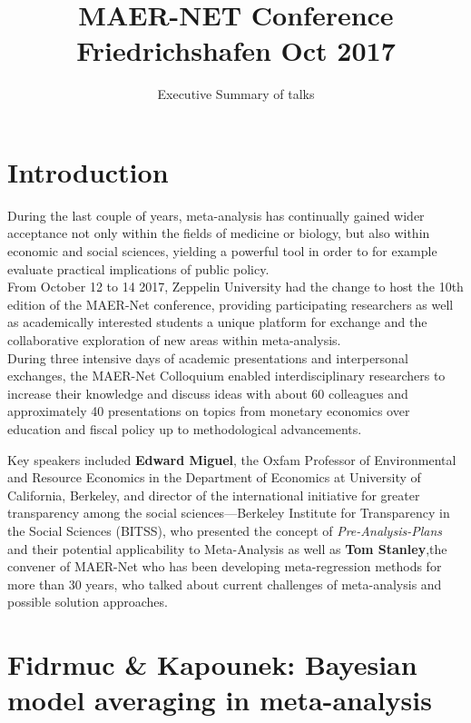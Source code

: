 \documentclass[a4paper,man,natbib]{apa6}
\title{MAER-NET Conference Friedrichshafen Oct 2017}
\affiliation{Marcel Schliebs}
\author{Executive Summary of talks}
\begin{document}
	
\justifying
\maketitle

\tableofcontents

\justifying

\section{Introduction}

During the last couple of years, meta-analysis has continually gained wider acceptance not only within the fields of medicine or biology, but also within economic and social sciences, yielding a powerful tool in order to for example evaluate practical implications of public policy. \\

From October 12 to 14 2017, Zeppelin University had the change to host the 10th edition of the MAER-Net conference, providing participating researchers as well as academically interested students a unique platform for exchange and the collaborative exploration of new areas within meta-analysis.\\

During three intensive days of academic presentations and interpersonal exchanges, the MAER-Net Colloquium enabled interdisciplinary researchers to increase their knowledge and discuss ideas with about 60 colleagues and approximately 40 presentations on topics from monetary economics over education and fiscal policy up to methodological advancements.

Key speakers included \textbf{Edward Miguel}, the Oxfam Professor of Environmental and Resource Economics in the Department of Economics at University of California, Berkeley, and director of the international initiative for greater transparency among the social sciences—Berkeley Institute for Transparency in the Social Sciences (BITSS), who presented the concept of \textit{Pre-Analysis-Plans} and their potential applicability to Meta-Analysis as well as 
\textbf{Tom Stanley},the convener of MAER-Net who has been developing meta-regression methods for more than 30 years, who talked about current challenges of meta-analysis and possible solution approaches.

\newpage
\justifying
\section{Fidrmuc \& Kapounek: Bayesian model averaging in meta-analysis}
\label{sec:BMA}
\end{document}
